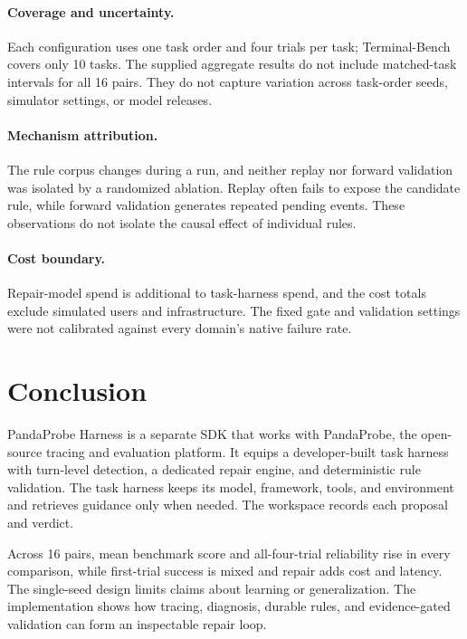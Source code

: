 \documentclass[11pt,letterpaper]{article}
\begin{document}
\paragraph{Coverage and uncertainty.}
Each configuration uses one task order and four trials per task;
Terminal-Bench covers only 10 tasks. The supplied aggregate results
do not include matched-task intervals for all 16 pairs. They do not
capture variation across task-order seeds, simulator settings, or
model releases.

\paragraph{Mechanism attribution.}
The rule corpus changes during a run, and neither replay nor forward
validation was isolated by a randomized ablation. Replay often fails
to expose the candidate rule, while forward validation generates
repeated pending events. These observations do not isolate the causal
effect of individual rules.

\paragraph{Cost boundary.}
Repair-model spend is additional to task-harness spend, and the
cost totals exclude simulated users and infrastructure. The fixed
gate and validation settings were not calibrated against every
domain's native failure rate.

\section{Conclusion}
\label{sec:conclusion}

PandaProbe Harness is a separate SDK that works with PandaProbe, the
open-source tracing and evaluation platform. It equips a developer-built
task harness with turn-level detection, a dedicated repair engine, and
deterministic rule validation. The task harness keeps its model, framework, tools, and
environment and retrieves guidance only when needed. The workspace
records each proposal and verdict.

Across 16 pairs, mean benchmark score and all-four-trial
reliability rise in every comparison, while first-trial success is
mixed and repair adds cost and latency. The single-seed design limits
claims about learning or generalization. The implementation shows
how tracing, diagnosis, durable rules, and evidence-gated validation
can form an inspectable repair loop.

\begingroup
\small
\setlength{\bibsep}{1pt}


\endgroup
\end{document}
